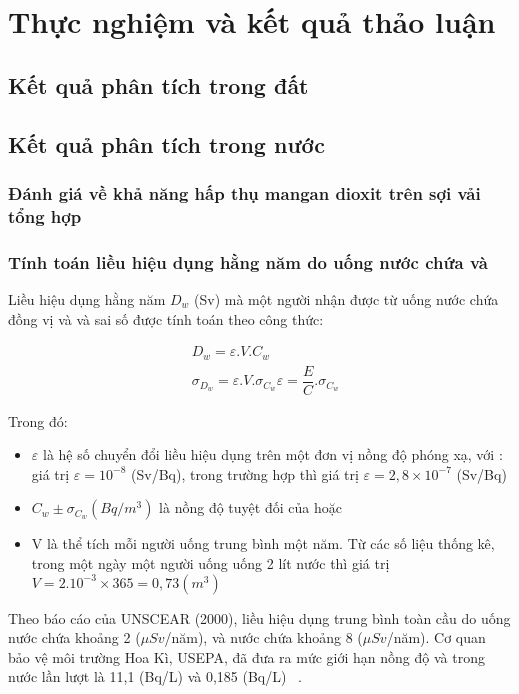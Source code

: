 \setcounter{chapter}{2}

\chapter{Thực nghiệm và kết quả thảo luận}
    \section{Kết quả phân tích  trong đất}
    \section{Kết quả phân tích  trong nước}
        \subsection{Đánh giá về khả năng hấp thụ mangan dioxit trên sợi vải tổng hợp}
        \subsection{Tính toán liều hiệu dụng hằng năm do uống nước chứa   và }
            Liều hiệu dụng hằng năm $D_w$ (Sv) mà một người nhận được từ uống nước chứa đồng vị  và  và sai số được tính toán theo công thức:  
            
            \begin{align}
                &D_w = \varepsilon. V. C_w\\
                &\sigma_{D_w} = \varepsilon.V.\sigma_{C_w} \varepsilon = \dfrac{E}{C}.\sigma_{C_w}
            \end{align}

            Trong đó: 
            \begin{itemize}
                \item $\varepsilon$ là hệ số chuyển đổi liều hiệu dụng trên một đơn vị nồng độ phóng xạ, với : giá trị $\varepsilon= 10^{-8}$ (Sv/Bq), trong trường hợp  thì giá trị $\varepsilon  = 2,8 \times 10^{-7} $ (Sv/Bq)
                \item $C_w \pm \sigma_{C_w}  (Bq/m^3)  $ là nồng độ tuyệt đối của    hoặc 
                \item V là thể tích mỗi người uống trung bình một năm. Từ các số liệu thống kê, trong một ngày một người uống  uống 2 lít nước thì giá trị $V  = 2.10^{-3} \times 365 = 0,73 (m^3) $ 
            \end{itemize}
           Theo báo cáo của UNSCEAR (2000), liều hiệu dụng trung bình toàn cầu do uống nước chứa  khoảng 2 ($\mu Sv$/năm), và nước  chứa  khoảng 8  ($\mu Sv$/năm).  Cơ quan bảo vệ môi trường Hoa Kì, USEPA, đã đưa ra mức giới hạn nồng độ   và  trong nước lần lượt là 11,1 (Bq/L) và 0,185 (Bq/L) ~\cite{Thesis:HNPThu}. 
           

    
\clearpage